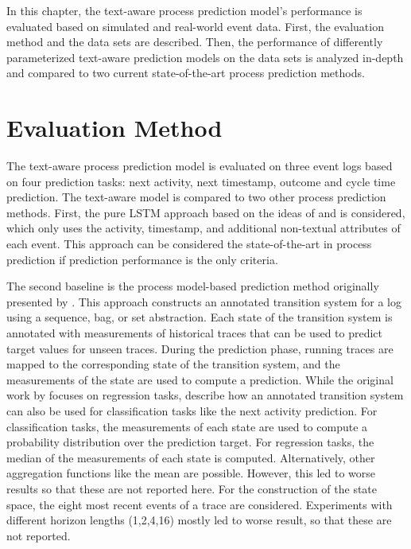 In this chapter, the text-aware process prediction model’s performance is evaluated based on simulated and real-world event data.
First, the evaluation method and the data sets are described.
Then, the performance of differently parameterized text-aware prediction models on the data sets is analyzed in-depth and compared to two current state-of-the-art process prediction methods.

\section{Evaluation Method}

The text-aware process prediction model is evaluated on three event logs based on four prediction tasks: next activity, next timestamp, outcome and cycle time prediction.
The text-aware model is compared to two other process prediction methods.
First, the pure LSTM approach based on the ideas of \citeauthor{DBLP:conf/caise/TaxVRD17} \cite{DBLP:conf/caise/TaxVRD17} and \citeauthor{DBLP:conf/ssci/NavarinVPS17} \cite{DBLP:conf/ssci/NavarinVPS17} is considered, which only uses the activity, timestamp, and additional non-textual attributes of each event.
This approach can be considered the state-of-the-art in process prediction if prediction performance is the only criteria.

The second baseline is the process model-based prediction method originally presented by \citeauthor{DBLP:journals/is/AalstSS11} \cite{DBLP:journals/is/AalstSS11}.
This approach constructs an annotated transition system for a log using a sequence, bag, or set abstraction.
Each state of the transition system is annotated with measurements of historical traces that can be used to predict target values for unseen traces.
During the prediction phase, running traces are mapped to the corresponding state of the transition system, and the measurements of the state are used to compute a prediction.
While the original work by \citeauthor{DBLP:journals/is/AalstSS11} focuses on regression tasks, \citeauthor{DBLP:journals/sosym/TaxTZ20} \cite{DBLP:journals/sosym/TaxTZ20} describe how an annotated transition system can also be used for classification tasks like the next activity prediction.
For classification tasks, the measurements of each state are used to compute a probability distribution over the prediction target.
For regression tasks, the median of the measurements of each state is computed.
Alternatively, other aggregation functions like the mean are possible.
However, this led to worse results so that these are not reported here.
For the construction of the state space, the eight most recent events of a trace are considered.
Experiments with different horizon lengths (1,2,4,16) mostly led to worse result, so that these are not reported.

